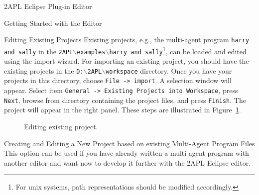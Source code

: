 \begin{section}{2APL Eclipse Plug-in Editor}
\begin{section}{Getting Started with the Editor}
\begin{subsection}{Editing Existing Projects}
Existing projects, e.g., the multi-agent program {\tt harry and
sally} in the {\tt 2APL$\backslash$examples$\backslash$harry and
sally}\footnote{For unix systems, path representations should be
modified accordingly.}, can be loaded and edited using the import
wizard. For importing an existing project, you should have the
existing projects in the
\texttt{D:$\backslash$2APL$\backslash$workspace} directory. Once you
have your projects in this directory, choose {\tt File -> import}. A
selection window will appear. Select item {\tt General -> Existing
Projects into Workspace}, press {\tt Next}, browse from directory
containing the project files, and press {\tt Finish}. The project
will appear in the right panel. These steps are illustrated in
Figure~\ref{fig:existingproject}.
    \begin{figure}[h]
        \begin{minipage}{0.3\linewidth}
            \begin{center}
            \end{center}
        \end{minipage}
        \hspace{.5cm}
        \begin{minipage}{0.3\linewidth}
            \begin{center}
            \end{center}
        \end{minipage}
        \hspace{.5cm}
        \begin{minipage}{0.3\linewidth}
            \begin{center}
            \end{center}
        \end{minipage}
        \caption{Editing existing project.}\label{fig:existingproject}
    \end{figure}
\end{subsection}

\begin{subsection}{Creating and Editing a New Project based on existing Multi-Agent Program Files}
This option can be used if you have already written a multi-agent
program with another editor and want now to develop it further with
the 2APL Eclipse editor.


\end{subsection}
\end{section}
\end{section}
